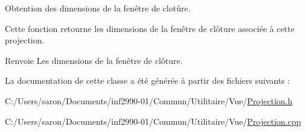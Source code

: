 Obtention des dimensions de la fenêtre de clotûre. 

Cette fonction retourne les dimensions de la fenêtre de clôture associée à cette projection.

\begin{DoxyReturn}{Renvoie}
Les dimensions de la fenêtre de clôture. 
\end{DoxyReturn}


La documentation de cette classe a été générée à partir des fichiers suivants \-:\begin{DoxyCompactItemize}
\item 
C\-:/\-Users/saron/\-Documents/inf2990-\/01/\-Commun/\-Utilitaire/\-Vue/\hyperlink{_projection_8h}{Projection.\-h}\item 
C\-:/\-Users/saron/\-Documents/inf2990-\/01/\-Commun/\-Utilitaire/\-Vue/\hyperlink{_projection_8cpp}{Projection.\-cpp}\end{DoxyCompactItemize}
